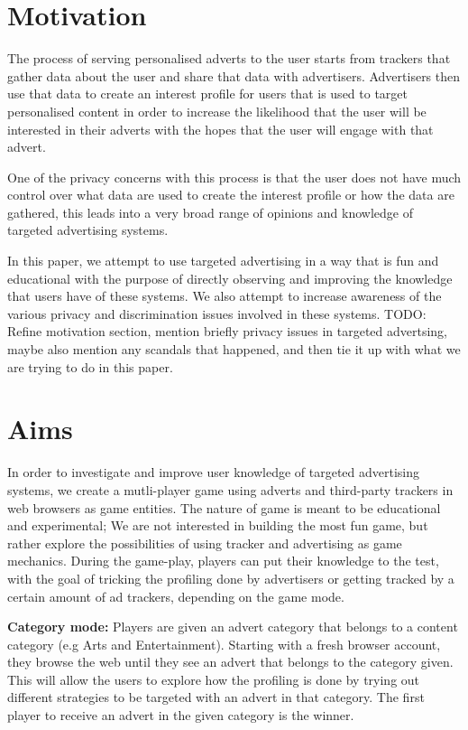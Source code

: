 \documentclass{l4proj}
\begin{document}
\section{Motivation}
The process of serving personalised adverts to the user starts from trackers that gather data about the user and share that data with advertisers. Advertisers then use that data to create an interest profile for users that is used to target personalised content in order to increase the likelihood that the user will be interested in their adverts with the hopes that the user will engage with that advert.

One of the privacy concerns with this process is that the user does not have much control over what data are used to create the interest profile or how the data are gathered, this leads into a very broad range of opinions and knowledge of targeted advertising systems.

In this paper, we attempt to use targeted advertising in a way that is fun and educational with the purpose of directly observing and improving the knowledge that users have of these systems. We also attempt to increase awareness of the various privacy and discrimination issues involved in these systems.
TODO: Refine motivation section, mention briefly privacy issues in targeted advertsing, maybe also mention any scandals that happened, and then tie it up with what we are trying to do in this paper.

\section{Aims}
In order to investigate and improve user knowledge of targeted advertising systems, we create a mutli-player game using adverts and third-party trackers in web browsers as game entities. The nature of game is meant to be educational and experimental; We are not interested in building the most fun game, but rather explore the possibilities of using tracker and advertising as game mechanics. During the game-play, players can put their knowledge to the test, with the goal of tricking the profiling done by advertisers or getting tracked by a certain amount of ad trackers, depending on the game mode.

\textbf{Category mode:} Players are given an advert category that belongs to a content category (e.g Arts and Entertainment). Starting with a fresh browser account, they browse the web until they see an advert that belongs to the category given. This will allow the users to explore how the profiling is done by trying out different strategies to be targeted with an advert in that category. The first player to receive an advert in the given category is the winner. 
\end{document}

